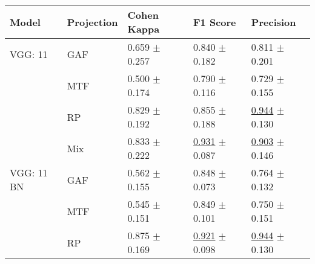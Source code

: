 
\begin{tabular}{lllll}
\toprule
Model & Projection & Cohen Kappa & F1 Score & Precision \\
\midrule
VGG: 11 & GAF & \textcolor[rgb]{0.5761353517,0.4238646483,0}{0.659} $\pm$ \textcolor[rgb]{0.9813763962,0.0186236038,0}{0.257} & \textcolor[rgb]{0.6130820399,0.3869179601,0}{0.840} $\pm$ \textcolor[rgb]{0.8179931192,0.1820068808,0}{0.182} & \textcolor[rgb]{0.5967365967,0.4032634033,0}{0.811} $\pm$ \textcolor[rgb]{0.6502693890,0.3497306110,0}{0.201} \\
 & MTF & \textcolor[rgb]{0.9501335708,0.0498664292,0}{0.500} $\pm$ \textcolor[rgb]{0.6654355176,0.3345644824,0}{0.174} & \textcolor[rgb]{0.8699186992,0.1300813008,0}{0.790} $\pm$ \textcolor[rgb]{0.4021860668,0.5000000000,0}{0.116} & \textcolor[rgb]{0.8974358974,0.1025641026,0}{0.729} $\pm$ \textcolor[rgb]{0.3672049968,0.5000000000,0}{0.155} \\
 & RP & \textcolor[rgb]{0.1763134461,0.5000000000,0}{0.829} $\pm$ \textcolor[rgb]{0.7355621391,0.2644378609,0}{0.192} & \textcolor[rgb]{0.5365853659,0.4634146341,0}{0.855} $\pm$ \textcolor[rgb]{0.8554220067,0.1445779933,0}{0.188} & \underline{\textcolor[rgb]{0.1025641026,0.5000000000,0}{0.944}} $\pm$ \textcolor[rgb]{0.2080512860,0.5000000000,0}{0.130} \\
 & Mix & \textcolor[rgb]{0.1665182547,0.5000000000,0}{0.833} $\pm$ \textcolor[rgb]{0.8482671723,0.1517328277,0}{0.222} & \underline{\textcolor[rgb]{0.1463414634,0.5000000000,0}{0.931}} $\pm$ \textcolor[rgb]{0.2240040057,0.5000000000,0}{0.087} & \underline{\textcolor[rgb]{0.2564102564,0.5000000000,0}{0.903}} $\pm$ \textcolor[rgb]{0.3075839781,0.5000000000,0}{0.146} \\
VGG: 11 BN & GAF & \textcolor[rgb]{0.8032056990,0.1967943010,0}{0.562} $\pm$ \textcolor[rgb]{0.5940200153,0.4059799847,0}{0.155} & \textcolor[rgb]{0.5691056911,0.4308943089,0}{0.848} $\pm$ \textcolor[rgb]{0.1349899397,0.5000000000,0}{0.073} & \textcolor[rgb]{0.7692307692,0.2307692308,0}{0.764} $\pm$ \textcolor[rgb]{0.2230100982,0.5000000000,0}{0.132} \\
 & MTF & \textcolor[rgb]{0.8432769368,0.1567230632,0}{0.545} $\pm$ \textcolor[rgb]{0.5762840628,0.4237159372,0}{0.151} & \textcolor[rgb]{0.5650406504,0.4349593496,0}{0.849} $\pm$ \textcolor[rgb]{0.3108773772,0.5000000000,0}{0.101} & \textcolor[rgb]{0.8205128205,0.1794871795,0}{0.750} $\pm$ \textcolor[rgb]{0.3384113914,0.5000000000,0}{0.151} \\
 & RP & \textcolor[rgb]{0.0685663402,0.5000000000,0}{0.875} $\pm$ \textcolor[rgb]{0.6443051694,0.3556948306,0}{0.169} & \underline{\textcolor[rgb]{0.1951219512,0.5000000000,0}{0.921}} $\pm$ \textcolor[rgb]{0.2928051170,0.5000000000,0}{0.098} & \underline{\textcolor[rgb]{0.1025641026,0.5000000000,0}{0.944}} $\pm$ \textcolor[rgb]{0.2080512860,0.5000000000,0}{0.130} \\

\end{tabular}
